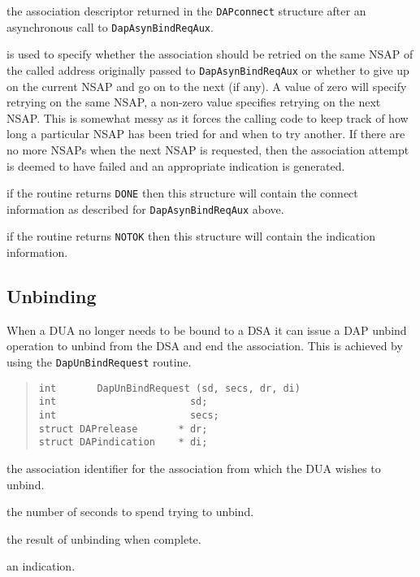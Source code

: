 \begin{describe}
\item [\verb"sd":]
the association descriptor returned in the \verb"DAPconnect"
structure after an asynchronous call to \verb"DapAsynBindReqAux".

\item [\verb"do\_next\_nsap":]
is used to specify whether the association should be retried on the
same NSAP of the called address originally passed to
\verb"DapAsynBindReqAux" or whether to give up on the current NSAP
and go on to the next (if any).
A value of zero will specify retrying on the same NSAP, a non-zero
value specifies retrying on the next NSAP.
This is somewhat messy as it forces the calling code to keep track
of how long a particular NSAP has been tried for and when to try
another.
If there are no more NSAPs when the next NSAP is requested, then the
association attempt is deemed to have failed and an appropriate
indication is generated.

\item [\verb"dc":]
if the routine returns \verb"DONE" then this structure will contain
the connect information as described for \verb"DapAsynBindReqAux"
above.

\item [\verb"di":]
if the routine returns \verb"NOTOK" then this structure will contain
the indication information.
\end{describe}

\subsection {Unbinding}

When a DUA no longer needs to be bound to a DSA it can issue a
DAP unbind operation to unbind from the DSA and end the association.
This is achieved by using the \verb"DapUnBindRequest" routine.

\begin{quote}\small\begin{verbatim}
int       DapUnBindRequest (sd, secs, dr, di)
int                       sd;
int                       secs;
struct DAPrelease       * dr;
struct DAPindication    * di;
\end{verbatim}\end{quote}

\begin {describe}

\item [\verb"sd":]
the association identifier for the association from which the
DUA wishes to unbind.

\item [\verb"secs":]
the number of seconds to spend trying to unbind.

\item [\verb"dr":]
the result of unbinding when complete.

\item [\verb"di":]
an indication.
\end{describe}

